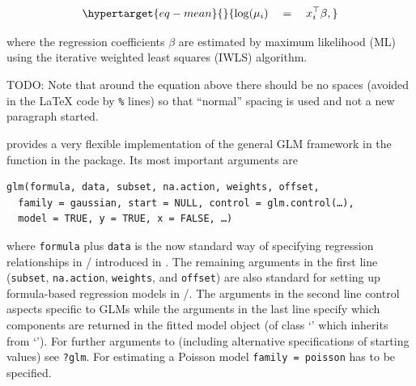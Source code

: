 \documentclass[
  article]{jss}
\newcommand{\class}[1]{`\code{#1}'}
\newcommand{\fct}[1]{\code{#1()}}
\begin{document}
\begin{equation}\protect\hypertarget{eq-mean}{}{
\log(\mu_i) \quad = \quad x_i^\top \beta,
}\label{eq-mean}\end{equation}

where the regression coefficients \(\beta\) are estimated by maximum
likelihood (ML) using the iterative weighted least squares (IWLS)
algorithm.

\begin{tcolorbox}[enhanced jigsaw, bottomrule=.15mm, colback=white, left=2mm, breakable, toprule=.15mm, opacityback=0, arc=.35mm, colframe=quarto-callout-color-frame, rightrule=.15mm, leftrule=.75mm]

TODO: Note that around the equation above there should be no spaces
(avoided in the {\LaTeX} code by \texttt{\%} lines) so that ``normal''
spacing is used and not a new paragraph started.

\end{tcolorbox}

 provides a very flexible implementation of the general GLM
framework in the function \fct{glm} \citet{ChambersHastie1992} in the
 package. Its most important arguments are

\begin{verbatim}
glm(formula, data, subset, na.action, weights, offset,
  family = gaussian, start = NULL, control = glm.control(…),
  model = TRUE, y = TRUE, x = FALSE, …)
\end{verbatim}

where \texttt{formula} plus \texttt{data} is the now standard way of
specifying regression relationships in /
introduced in \citet{ChambersHastie1992}. The remaining arguments in the
first line (\texttt{subset}, \texttt{na.action}, \texttt{weights}, and
\texttt{offset}) are also standard for setting up formula-based
regression models in /. The arguments in the
second line control aspects specific to GLMs while the arguments in the
last line specify which components are returned in the fitted model
object (of class \class{glm} which inherits from \class{lm}). For
further arguments to \fct{glm} (including alternative specifications of
starting values) see \texttt{?glm}. For estimating a Poisson model
\texttt{family\ =\ poisson} has to be specified.
\end{document}
